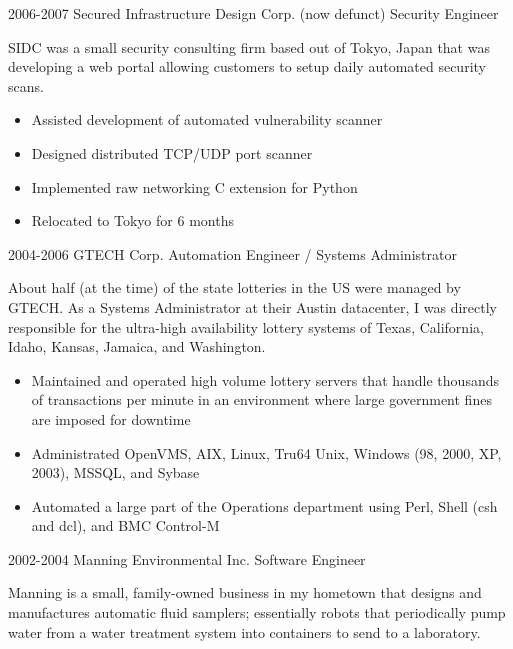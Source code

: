 \documentclass[]{friggeri-cv}
\begin{document}
\begin{entrylist}
  \entry
    {2006-2007}
    {Secured Infrastructure Design Corp. (now defunct)}
    {Security Engineer}
    {

      SIDC was a small security consulting firm based out of Tokyo,
      Japan that was developing a web portal allowing customers to
      setup daily automated security scans.\\
      
      \begin{itemize}
        \item{Assisted development of automated vulnerability scanner}
        \item{Designed distributed TCP/UDP port scanner}
        \item{Implemented raw networking C extension for Python}
        \item{Relocated to Tokyo for 6 months}
      \end{itemize}
    }
  \entry
    {2004-2006}
    {GTECH Corp.}
    {Automation Engineer / Systems Administrator}
    {

      About half (at the time) of the state lotteries in the US were
      managed by GTECH. As a Systems Administrator at their Austin
      datacenter, I was directly responsible for the ultra-high
      availability lottery systems of Texas, California, Idaho,
      Kansas, Jamaica, and Washington.\\
      
      \begin{itemize}
      \item{Maintained and operated high volume lottery servers that handle thousands of transactions per minute in an environment where large government fines are imposed for downtime}
      \item{Administrated OpenVMS, AIX, Linux, Tru64  Unix, Windows (98, 2000, XP, 2003), MSSQL, and Sybase}
      \item{Automated a large part of the Operations department using Perl, Shell (csh and dcl), and BMC Control-M}
      \end{itemize}
    }
  \entry
    {2002-2004}
    {Manning Environmental Inc.}
    {Software Engineer}
    {

      Manning is a small, family-owned business in my hometown that
      designs and manufactures automatic fluid samplers; essentially
      robots that periodically pump water from a water treatment
      system into containers to send to a laboratory.\\
      
}
\end{entrylist}
\end{document}
